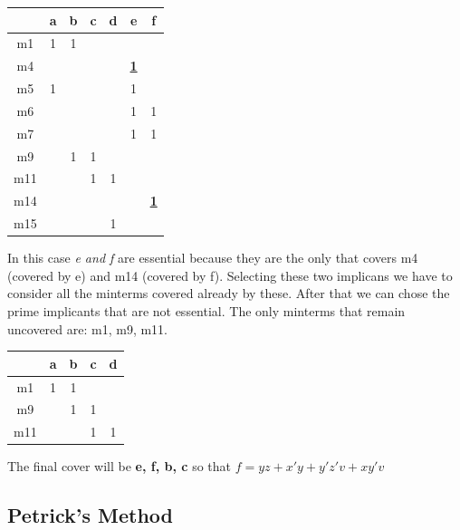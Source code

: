 \begin{center}
	
	\begin{tabular}{|c| c c c c c c|}
		\hline
		{} & a & b & c & d & \textbf{e} & \textbf{f} \\ \hline
		m1 & 1 & 1 & {} & {} & {} & {} \\
		m4 & {} & {} & {} & {} & \underline{\textbf{1}} & {} \\
		m5 & 1 & {} & {} & {} & 1 & {} \\
		m6 & {} & {} & {} & {} & 1 & 1 \\
		m7 & {} & {} & {} & {} & 1 & 1 \\
		m9 & {} & 1 & 1 & {} & {} & {} \\
		m11 & {} & {} & 1 & 1 & {} & {} \\
		m14 & {} & {} & {} & {} & {} & \underline{\textbf{1}} \\
		m15 & {} & {} & {} & 1 & {} & {} \\ \hline
		
	\end{tabular}
	
\bigskip
In this case \textit{e and f} are essential because they are the only that covers m4 (covered by e) and m14 (covered by f). Selecting these two implicans we have to consider all the minterms covered already by these. After that we can chose the prime implicants that are not essential. The only minterms that remain uncovered are: m1, m9, m11.

	\begin{tabular}{|c| c c c c |}
		\hline
		{} & a & \textbf{b} & \textbf{c} & d  \\ \hline
		m1 & 1 & 1 & {} & {} \\
		m9 & {} & 1 & 1 & {} \\
		m11 & {} & {} & 1 & 1 \\ \hline
	
	\end{tabular}
\bigskip

The final cover will be \textbf{ e, f, b, c } so that $f = yz + x'y + y'z'v + xy'v$ 

\end{center}

\subsection{Petrick's Method}




